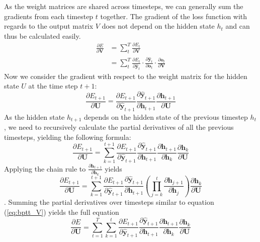 \documentclass[12pt, a4paper, headinclude, twoside, plainheadsepline, open=right, numbers=noenddot, hidelinks, toc=listof, toc=bibliography]{scrreprt}
\begin{document}
As the weight matrices are shared across timesteps, we can generally sum the gradients from each timestep $t$ together.
The gradient of the loss function with regards to the output matrix $V$ does not depend on the hidden state $h_t$ and can thus be calculated easily.
\begin{equation}
\label{eq:bptt_V}
\begin{split}
\frac{\partial E}{\partial \mathbf{V}} 
& = 
\sum_{t}^{T} \frac{\partial E_t}{\partial \mathbf{V}} \\
& =
\sum_{t}^{T} 
\frac{\partial E_t}{\partial \mathbf{\hat{y}}_t} 
\cdot 
\frac{\partial \mathbf{\hat{y}}_t}{\partial \mathbf{o}_t} 
\cdot 
\frac{\partial \mathbf{o}_t}{\partial \mathbf{V}}
\end{split}
\end{equation}
Now we consider the gradient with respect to the weight matrix for the hidden state $U$ at the time step $t+1$:
\begin{equation}
\frac{\partial E_{t+1}}{\partial \mathbf{U}} = 
\frac{\partial E_{t+1}}{\partial \mathbf{\hat{y}}_{t+1}}
\frac{\partial \mathbf{\hat{y}}_{t+1}}{\partial \mathbf{h}_{t+1}}
\frac{\partial \mathbf{h}_{t+1}}{\partial \mathbf{U}}
\end{equation}
As the hidden state $h_{t+1}$ depends on the hidden state of the previous timestep $h_t$, we need to recursively calculate the partial derivatives of all the previous timesteps, yielding the following formula:
\begin{equation}
\frac{\partial E_{t+1}}{\partial \mathbf{U}} = \sum_{k=1}^{t+1}
\frac{\partial E_{t+1}}{\partial \mathbf{\hat{y}}_{t+1}}
\frac{\partial \mathbf{\hat{y}}_{t+1}}{\partial \mathbf{h}_{t+1}}
\frac{\partial \mathbf{h}_{t+1}}{\partial \mathbf{h}_k}
\frac{\partial \mathbf{h}_k}{\partial \mathbf{U}}
\end{equation}
Applying the chain rule to $\frac{\partial \mathbf{h}_{t+1}}{\partial \mathbf{h}_k}$ yields
\begin{equation}
\frac{\partial E_{t+1}}{\partial \mathbf{U}} = \sum_{k=1}^{t+1}
\frac{\partial E_{t+1}}{\partial \mathbf{\hat{y}}_{t+1}}
\frac{\partial \mathbf{\hat{y}}_{t+1}}{\partial \mathbf{h}_{t+1}}
\left(\prod_{j=k}^{t}\frac{\partial \mathbf{h}_{j+1}}{\partial \mathbf{h}_j}\right)
\frac{\partial \mathbf{h}_k}{\partial \mathbf{U}}
\end{equation}\cite{aratBackpropagationTimeRecurrent2019}.
Summing the partial derivatives over timesteps similar to equation (\ref{eq:bptt_V}) yields the full equation
\begin{equation}
\label{eq:bptt_U}
\frac{\partial E}{\partial \mathbf{U}} = 
\sum_{t=1}^{T}
\sum_{k=1}^{t}
\frac{\partial E_{t+1}}{\partial \mathbf{\hat{y}}_{t+1}}
\frac{\partial \mathbf{\hat{y}}_{t+1}}{\partial \mathbf{h}_{t+1}}
\frac{\partial \mathbf{h}_{t+1}}{\partial \mathbf{h}_k}
\frac{\partial \mathbf{h}_k}{\partial \mathbf{U}}
\end{equation}
\end{document}
